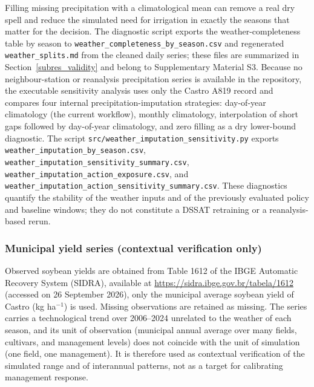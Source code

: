 \documentclass[times,final,authoryear]{elsarticle}
\begin{document}
Filling missing precipitation with a climatological mean can remove a real dry spell and reduce the simulated need for irrigation in exactly the seasons that matter for the decision. The diagnostic script exports the weather-completeness table by season to \texttt{weather\_completeness\_by\_season.csv} and regenerated \texttt{weather\_splits.md} from the cleaned daily series; these files are summarized in Section~\ref{subres_validity} and belong to Supplementary Material S3. Because no neighbour-station or reanalysis precipitation series is available in the repository, the executable sensitivity analysis uses only the Castro A819 record and compares four internal precipitation-imputation strategies: day-of-year climatology (the current workflow), monthly climatology, interpolation of short gaps followed by day-of-year climatology, and zero filling as a dry lower-bound diagnostic. The script \texttt{src/weather\_imputation\_sensitivity.py} exports \texttt{weather\_imputation\_by\_season.csv}, \texttt{weather\_imputation\_sensitivity\_summary.csv}, \texttt{weather\_imputation\_action\_exposure.csv}, and \texttt{weather\_imputation\_action\_sensitivity\_summary.csv}. These diagnostics quantify the stability of the weather inputs and of the previously evaluated policy and baseline windows; they do not constitute a DSSAT retraining or a reanalysis-based rerun.

\subsubsection{Municipal yield series (contextual verification only)}
\label{subsidra}

Observed soybean yields are obtained from Table 1612 of the IBGE Automatic Recovery System (SIDRA), available at
\url{https://sidra.ibge.gov.br/tabela/1612} (accessed on 26 September 2026), only the municipal average soybean yield of Castro (kg ha$^{-1}$) is used. Missing observations are retained as missing. The series carries a technological trend over 2006--2024 unrelated to the weather of each season, and its unit of observation (municipal annual average over many fields, cultivars, and management levels) does not coincide with the unit of simulation (one field, one management). It is therefore used as contextual verification of the simulated range and of interannual patterns, not as a target for calibrating management response.
\end{document}
